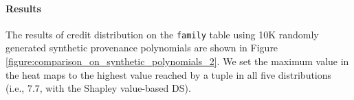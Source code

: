\documentclass[preprint,12pt,sort&compress]{elsarticle}
\newcommand{\rtwo}[1]{\textcolor{reviewer2}{#1}}
\newcommand{\scream}[1]{{\bf * #1 *}{\typeout{#1}}}
\begin{document}
\paragraph{Results} The results of credit distribution on the \texttt{family} table using 10K randomly generated synthetic provenance polynomials are shown in
Figure \ref{figure:comparison_on_synthetic_polynomials_2}. 
We set the maximum value in the heat maps to the highest value reached by a tuple in all \rtwo{five} distributions (i.e., $7.7$, with the Shapley value-based DS). 


\end{document}
